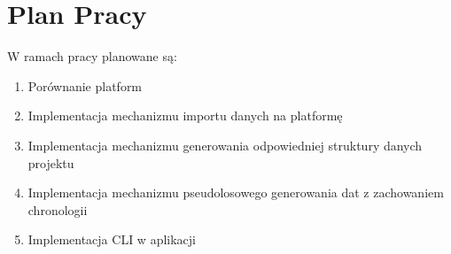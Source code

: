 \section{Plan Pracy}
W ramach pracy planowane są:
\begin{enumerate}
    \item Porównanie platform
    \item Implementacja mechanizmu importu danych na platformę
    \item Implementacja mechanizmu generowania odpowiedniej struktury danych projektu
    \item Implementacja mechanizmu pseudolosowego generowania dat z zachowaniem chronologii
    \item Implementacja CLI w aplikacji
\end{enumerate}
